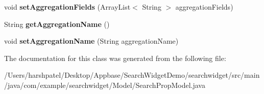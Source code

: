 \begin{DoxyCompactItemize}
void {\bfseries set\+Aggregation\+Fields} (Array\+List$<$ String $>$ aggregation\+Fields)
\item 
\mbox{\label{classcom_1_1example_1_1searchwidget_1_1_model_1_1_search_prop_model_a616872da851c8552eaf4f880b0d9b7f6}} 
String {\bfseries get\+Aggregation\+Name} ()
\item 
\mbox{\label{classcom_1_1example_1_1searchwidget_1_1_model_1_1_search_prop_model_a9478852effcc5c6049f192c5f36a03c3}} 
void {\bfseries set\+Aggregation\+Name} (String aggregation\+Name)
\end{DoxyCompactItemize}


The documentation for this class was generated from the following file\+:\begin{DoxyCompactItemize}
\item 
/\+Users/harshpatel/\+Desktop/\+Appbase/\+Search\+Widget\+Demo/searchwidget/src/main/java/com/example/searchwidget/\+Model/Search\+Prop\+Model.\+java\end{DoxyCompactItemize}
